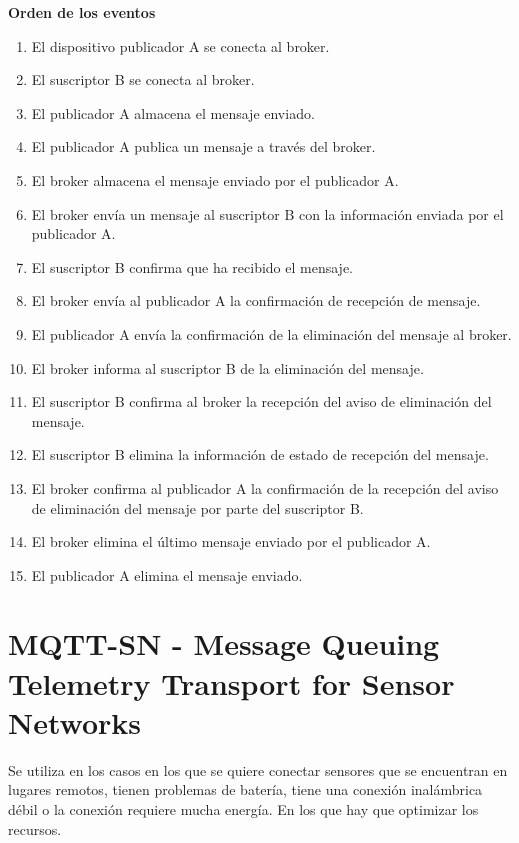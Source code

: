 \documentclass[12pt, twoside, openright]{report} %
\begin{document}
\begin{description}
	      \textbf{Orden de los eventos}
	      \begin{enumerate}
		      \item El dispositivo publicador A se conecta al broker.
		      \item El suscriptor B se conecta al broker.
		      \item El publicador A almacena el mensaje enviado.
		      \item El publicador A publica un mensaje a través del broker.
		      \item El broker almacena el mensaje enviado por el publicador A.
		      \item El broker envía un mensaje al suscriptor B con la información enviada por el publicador A.
		      \item El suscriptor B confirma que ha recibido el mensaje.
		      \item El broker envía al publicador A la confirmación de recepción de mensaje.
		      \item El publicador A envía la confirmación de la eliminación del mensaje al broker.
		      \item El broker informa al suscriptor B de la eliminación del mensaje.
		      \item El suscriptor B confirma al broker la recepción del aviso de eliminación del mensaje.
		      \item El suscriptor B elimina la información de estado de recepción del mensaje.
		      \item El broker confirma al publicador A la confirmación de la recepción del aviso de eliminación del mensaje por parte del suscriptor B.
		      \item El broker elimina el último mensaje enviado por el publicador A.
		      \item El publicador A elimina el mensaje enviado.
	      \end{enumerate}

\end{description}
\pagebreak
\section{MQTT-SN - Message Queuing Telemetry Transport for Sensor Networks}
Se utiliza en los casos en los que se quiere conectar sensores que se encuentran en lugares remotos, tienen problemas de batería, tiene una conexión inalámbrica débil o la conexión requiere mucha energía. En los que hay que optimizar los recursos.
\end{document}
